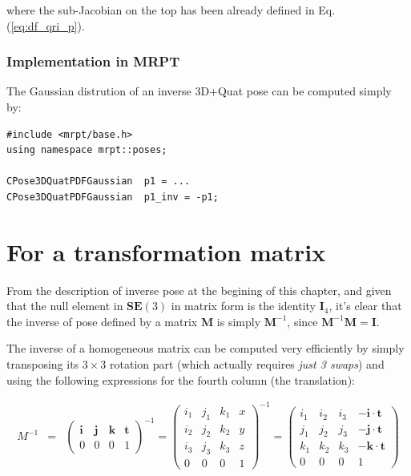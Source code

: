 \documentclass[a4paper,11pt]{report}
\begin{document}
\noindent where the sub-Jacobian on the top has been already defined in Eq.(\ref{eq:df_qri_p}).



\subsubsection{Implementation in MRPT}

The Gaussian distrution of an inverse 3D+Quat pose can be computed simply by:

\begin{lstlisting}
#include <mrpt/base.h> 
using namespace mrpt::poses; 

CPose3DQuatPDFGaussian  p1 = ...
CPose3DQuatPDFGaussian  p1_inv = -p1;
\end{lstlisting}



\section{For a transformation matrix}
\label{sect:inverse:mat}

From the description of inverse pose at the begining of this chapter, and given
that the null element in $\mathbf{SE}(3)$ in matrix form is the identity $\mathbf{I}_4$, 
it's clear that the inverse of pose defined by a matrix $\mathbf{M}$ is simply $\mathbf{M}^{-1}$, 
since $\mathbf{M}^{-1}\mathbf{M}=\mathbf{I}$.

The inverse of a homogeneous matrix can be computed very efficiently by 
simply transposing its $3 \times 3$ rotation part (which actually requires \emph{just 3 swaps}) 
and using the following expressions for the fourth column (the translation):

\begin{eqnarray}
M^{-1} &=& 
\left(
  \begin{array}{ccc|c}
   \mathbf{i} & \mathbf{j} & \mathbf{k} & \mathbf{t} \\
\hline
   0 & 0 & 0 & 1
  \end{array}
\right) ^{-1} 
= 
\left(
  \begin{array}{ccc|c}
   i_1 & j_1 & k_1 & x \\
   i_2 & j_2 & k_2 & y \\
   i_3 & j_3 & k_3 & z \\
\hline
   0 & 0 & 0 & 1
  \end{array}
\right) ^{-1} 
= 
\left(
  \begin{array}{ccc|c}
   i_1 & i_2 & i_3   & -\mathbf{i} \cdot \mathbf{t} \\ 
   j_1 & j_2 & j_3   & -\mathbf{j} \cdot \mathbf{t} \\ 
   k_1 & k_2 & k_3   & -\mathbf{k} \cdot \mathbf{t} \\ 
\hline
   0 & 0 & 0 & 1
  \end{array}
\right)
\end{eqnarray}
\end{document}

